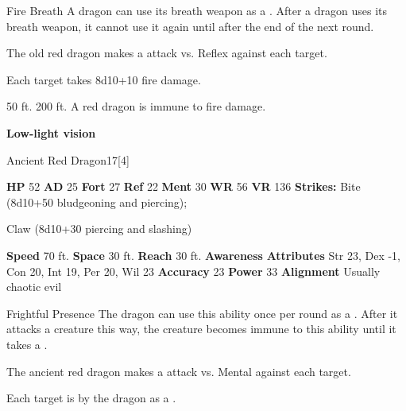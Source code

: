     \begin{freeability}{Fire Breath}
      A dragon can use its breath weapon as a .
      After a dragon uses its breath weapon, it cannot use it again until after the end of the next round.
      \par The old red dragon makes a  attack
        vs. Reflex against each target.
    
    \hit Each target takes 8d10+10 fire damage.
    \end{freeability}
  
      
       50 ft.
     200 ft.
     A red dragon is immune to fire damage.
    \par\noindent\textbf{Low-light vision}
  

  \begin{monsubsection}{Ancient Red Dragon}{17}[4]
    \vspace{-1em}\vspace{-1em}
    \vspace{0em}

    
    

    \begin{spellcontent}
      \begin{spelltargetinginfo}
        \pari \textbf{HP} 52 \monsep
          \textbf{AD} 25 \monsep
          \textbf{Fort} 27 \monsep
          \textbf{Ref} 22 \monsep
          \textbf{Ment} 30
        \pari \textbf{WR} 56 \monsep
        \textbf{VR} 136
        \pari \textbf{Strikes:}
            Bite  (8d10+50 bludgeoning and piercing);
\par Claw  (8d10+30 piercing and slashing)
      \end{spelltargetinginfo}
    \end{spellcontent}
    \begin{monsterfooter}
      \pari \textbf{Speed} 70 ft. \monsep
        \textbf{Space} 30 ft. \monsep
        \textbf{Reach} 30 ft.
      \pari \textbf{Awareness} 
      \pari \textbf{Attributes}
        Str 23, Dex -1,
        Con 20, Int 19,
        Per 20, Wil 23
      \pari \textbf{Accuracy} 23 \monsep
        \textbf{Power} 33
      \pari \textbf{Alignment} Usually chaotic evil
    \end{monsterfooter}
  \end{monsubsection}
  \begin{freeability}{Frightful Presence}
      The dragon can use this ability once per round as a .
      After it attacks a creature this way, the creature becomes immune to this ability until it takes a .
      \par The ancient red dragon makes a  attack
        vs. Mental against each target.
    
    \hit Each target is  by the dragon as a .
    \end{freeability}
  


